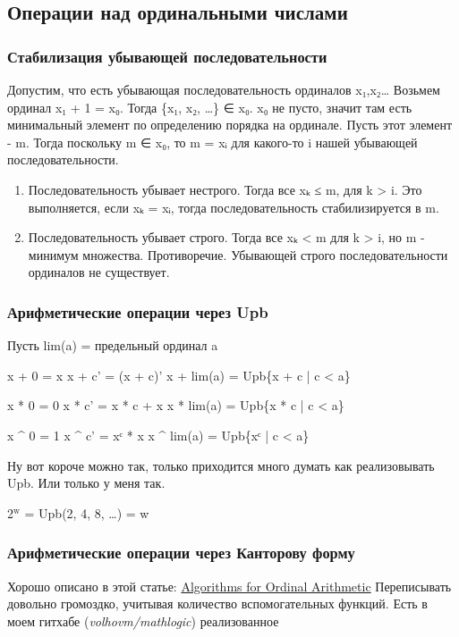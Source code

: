 \documentclass[11pt]{article}
\begin{document}
\subsection{Операции над ординальными числами}
\label{sec-16-2}
\subsubsection{Стабилизация убывающей последовательности}
\label{sec-16-2-1}
Допустим, что есть убывающая последовательность ординалов x₁,x₂\ldots{}
Возьмем ординал x₁ + 1 = x₀. Тогда \{x₁, x₂, \ldots{}\} ∈ x₀. x₀ не пусто,
значит там есть минимальный элемент по определению порядка на ординале.
Пусть этот элемент - m. Тогда поскольку m ∈ x₀, то m = xᵢ для какого-то
i нашей убывающей последовательности.
\begin{enumerate}
\item Последовательность убывает нестрого.
Тогда все xₖ ≤ m, для k > i. Это выполняется, если xₖ = xᵢ, тогда
последовательность стабилизируется в m.
\item Последовательность убывает строго.
Тогда все xₖ < m для k > i, но m - минимум множества. Противоречие.
Убывающей строго последовательности ординалов не существует.
\end{enumerate}
\subsubsection{Арифметические операции через Upb}
\label{sec-16-2-2}
Пусть lim(a) = предельный ординал a

x + 0       = x
x + c'      = (x + c)'
x + lim(a)  = Upb\{x + c | c < a\}

x * 0       = 0
x * c'      = x * c + x
x * lim(a)  = Upb\{x * c | c < a\}

x \^{} 0       = 1
x \^{} c'      = xᶜ * x
x \^{} lim(a)  = Upb\{xᶜ | c < a\}

Ну вот короче можно так, только приходится много думать
как реализовывать Upb. Или только у меня так.

2$^{\text{w}}$ = Upb(2, 4, 8, \ldots{}) = w
\subsubsection{Арифметические операции через Канторову форму}
\label{sec-16-2-3}
Хорошо описано в этой статье:
\href{http://www.google.ru/url?sa=t&rct=j&q=&esrc=s&source=web&cd=1&ved=0CB4QFjAA&url=http://www.ccs.neu.edu/home/pete/pub/cade-algorithms-ordinal-arithmetic.pdf&ei=FDW6VJOYNuvXyQPd0ILQBQ&usg=AFQjCNENBOBOdKbbqBYN3iFhmAu_jFD2Sw&sig2=1UISFzJ_21I8f1YScX7Tkw&bvm=bv.83829542,d.bGQ&cad=rjt}{Algorithms for Ordinal Arithmetic}
Переписывать довольно громоздко, учитывая количество вспомогательных
функций. Есть в моем гитхабе (\emph{volhovm/mathlogic}) реализованное
\end{document}
